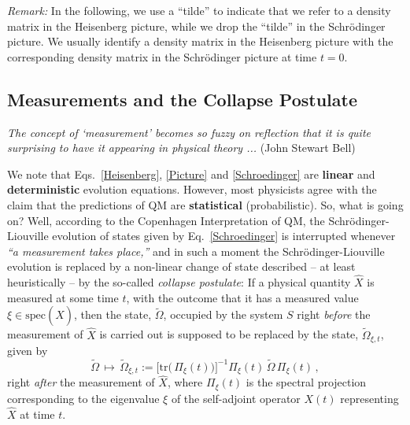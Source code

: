 \documentclass[a4paper,11pt]{article}
\begin{document}
\textit{Remark:} In the following, we use a ``tilde'' to indicate that we refer to a density matrix in the Heisenberg picture, while we drop the ``tilde'' in the Schr\"odinger picture. We usually identify a density matrix in the Heisenberg picture with the corresponding density matrix in the Schr\"odinger picture at time $t=0$.

\subsection{Measurements and the Collapse Postulate}

\hspace{0.5cm}\textit{The concept of `measurement' becomes so fuzzy on reflection that it is quite surprising to have it appearing in physical theory ...} (John Stewart Bell)

We note that Eqs.~\eqref{Heisenberg}, \eqref{Picture} and \eqref{Schroedinger} are {\bf{linear}} and {\bf{deterministic}} 
evolution equations.
However, most physicists agree with the claim that the predictions of QM are {\bf{statistical}} (probabilistic). So, what is 
going on? Well, according to the Copenhagen Interpretation of QM, the Schr\"odinger-Liouville evolution of states given 
by Eq.~\eqref{Schroedinger} is interrupted whenever  \textit{``a measurement takes place,''} and in such a moment 
the Schr\"odinger-Liouville evolution is replaced by a non-linear change of state described -- at least heuristically  -- 
by the so-called \textit{collapse postulate}: If a physical quantity $\hat{X}$ is measured at some time $t$, with the outcome
 that it has a measured value $\xi \in \text{spec}(\hat{X})$, then the state, $\widetilde{\Omega}$, occupied by the system 
 $S$ right \textit{before} the measurement of $\hat{X}$ is carried out is supposed to be replaced by the state, 
 $\widetilde{\Omega}_{\xi, t}$, given by
\begin{equation}\label{collapse}
\widetilde{\Omega} \,\mapsto\,  \widetilde{\Omega}_{\xi, t} := \big[\text{tr}\big(\,\Pi_{\xi}(t)\big)\big]^{-1} \Pi_{\xi}(t)\, 
\widetilde{\Omega}\, \Pi_{\xi}(t)\,,
\end{equation}
right \textit{after} the measurement of $\hat{X}$, where $\Pi_{\xi}(t)$ is the spectral projection corresponding to the eigenvalue $\xi$ of the self-adjoint operator $X(t)$ representing $\hat{X}$ at time $t$. 
\end{document}
